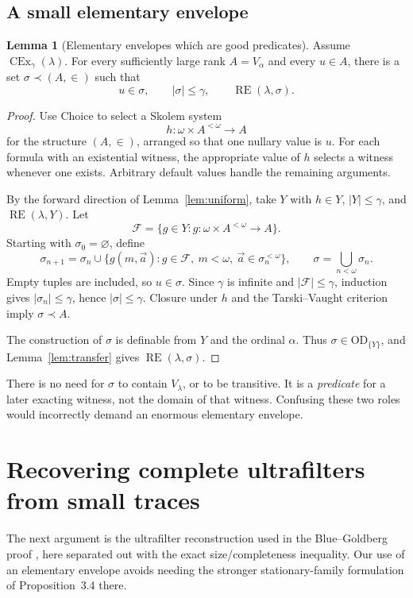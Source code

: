 \documentclass[11pt,letterpaper]{article}
\theoremstyle{definition}
\newtheorem{lemma}[definition]{Lemma}
\newcommand{\OD}{\mathrm{OD}}
\newcommand{\CEx}{\operatorname{CEx}}
\newcommand{\RE}{\operatorname{RE}}
\begin{document}
\subsection{A small elementary envelope}

\begin{lemma}[Elementary envelopes which are good predicates]\label{lem:envelope}
Assume $\CEx_\gamma(\lambda)$. For every sufficiently large rank $A=V_\alpha$ and every $u\in A$, there is a set $\sigma\prec(A,\in)$ such that
\[
u\in\sigma,\qquad |\sigma|\le\gamma,\qquad \RE(\lambda,\sigma).
\]
\end{lemma}
\begin{proof}
Use Choice to select a Skolem system
\[
h:\omega\times A^{<\omega}\longrightarrow A
\]
for the structure $(A,\in)$, arranged so that one nullary value is $u$. For each formula with an existential witness, the appropriate value of $h$ selects a witness whenever one exists. Arbitrary default values handle the remaining arguments.

By the forward direction of Lemma~\ref{lem:uniform}, take $Y$ with $h\in Y$, $|Y|\le\gamma$, and $\RE(\lambda,Y)$. Let
\[
\mathcal F=\{g\in Y:g:\omega\times A^{<\omega}\to A\}.
\]
Starting with $\sigma_0=\varnothing$, define
\[
\sigma_{n+1}=\sigma_n\cup
\{g(m,\vec a):g\in\mathcal F,\ m<\omega,\ \vec a\in\sigma_n^{<\omega}\},
\qquad \sigma=\bigcup_{n<\omega}\sigma_n.
\]
Empty tuples are included, so $u\in\sigma$. Since $\gamma$ is infinite and $|\mathcal F|\le\gamma$, induction gives $|\sigma_n|\le\gamma$, hence $|\sigma|\le\gamma$. Closure under $h$ and the Tarski--Vaught criterion imply $\sigma\prec A$.

The construction of $\sigma$ is definable from $Y$ and the ordinal $\alpha$. Thus $\sigma\in\OD_{\{Y\}}$, and Lemma~\ref{lem:transfer} gives $\RE(\lambda,\sigma)$.
\end{proof}

There is no need for $\sigma$ to contain $V_\lambda$, or to be transitive. It is a \emph{predicate} for a later exacting witness, not the domain of that witness. Confusing these two roles would incorrectly demand an enormous elementary envelope.

\section{Recovering complete ultrafilters from small traces}\label{sec:trace}

The next argument is the ultrafilter reconstruction used in the Blue--Goldberg proof \cite[proof of Theorem 3.7]{cover}, here separated out with the exact size/completeness inequality. Our use of an elementary envelope avoids needing the stronger stationary-family formulation of Proposition~3.4 there.
\end{document}
